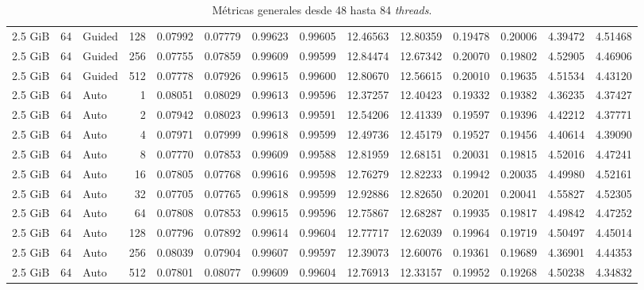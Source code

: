 \begin{table}[H]
\begin{adjustbox}{width=\textwidth, keepaspectratio}
\begin{tabular}{rrlrrrrrrrrrrr}
                    2.5 GiB & 64 & Guided & 128 & 0.07992 & 0.07779 & 0.99623 & 0.99605 & 12.46563 & 12.80359 & 0.19478 & 0.20006 & 4.39472 & 4.51468 \\
                    2.5 GiB & 64 & Guided & 256 & 0.07755 & 0.07859 & 0.99609 & 0.99599 & 12.84474 & 12.67342 & 0.20070 & 0.19802 & 4.52905 & 4.46906 \\
                    2.5 GiB & 64 & Guided & 512 & 0.07778 & 0.07926 & 0.99615 & 0.99600 & 12.80670 & 12.56615 & 0.20010 & 0.19635 & 4.51534 & 4.43120 \\
                    2.5 GiB & 64 & Auto & 1 & 0.08051 & 0.08029 & 0.99613 & 0.99596 & 12.37257 & 12.40423 & 0.19332 & 0.19382 & 4.36235 & 4.37427 \\
                    2.5 GiB & 64 & Auto & 2 & 0.07942 & 0.08023 & 0.99613 & 0.99591 & 12.54206 & 12.41339 & 0.19597 & 0.19396 & 4.42212 & 4.37771 \\
                    2.5 GiB & 64 & Auto & 4 & 0.07971 & 0.07999 & 0.99618 & 0.99599 & 12.49736 & 12.45179 & 0.19527 & 0.19456 & 4.40614 & 4.39090 \\
                    2.5 GiB & 64 & Auto & 8 & 0.07770 & 0.07853 & 0.99609 & 0.99588 & 12.81959 & 12.68151 & 0.20031 & 0.19815 & 4.52016 & 4.47241 \\
                    2.5 GiB & 64 & Auto & 16 & 0.07805 & 0.07768 & 0.99616 & 0.99598 & 12.76279 & 12.82233 & 0.19942 & 0.20035 & 4.49980 & 4.52161 \\
                    2.5 GiB & 64 & Auto & 32 & 0.07705 & 0.07765 & 0.99618 & 0.99599 & 12.92886 & 12.82650 & 0.20201 & 0.20041 & 4.55827 & 4.52305 \\
                    2.5 GiB & 64 & Auto & 64 & 0.07808 & 0.07853 & 0.99615 & 0.99596 & 12.75867 & 12.68287 & 0.19935 & 0.19817 & 4.49842 & 4.47252 \\
                    2.5 GiB & 64 & Auto & 128 & 0.07796 & 0.07892 & 0.99614 & 0.99604 & 12.77717 & 12.62039 & 0.19964 & 0.19719 & 4.50497 & 4.45014 \\
                    2.5 GiB & 64 & Auto & 256 & 0.08039 & 0.07904 & 0.99607 & 0.99597 & 12.39073 & 12.60076 & 0.19361 & 0.19689 & 4.36901 & 4.44353 \\
                    2.5 GiB & 64 & Auto & 512 & 0.07801 & 0.08077 & 0.99609 & 0.99604 & 12.76913 & 12.33157 & 0.19952 & 0.19268 & 4.50238 & 4.34832 \\
                    \bottomrule
                \end{tabular}
            \end{adjustbox}
            \caption{Métricas generales desde 48 hasta 84 \textit{threads}.}
            \label{tab:distance_metrics_4}
        \end{table}